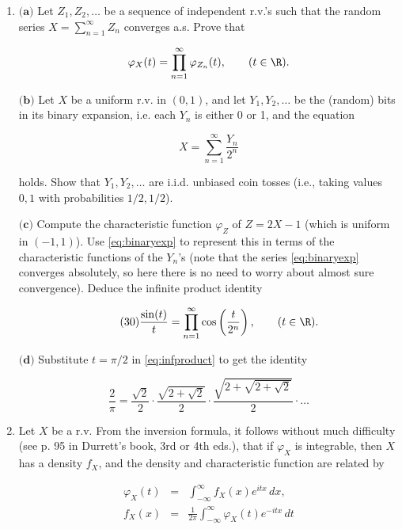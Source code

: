 \begin{enumerate}[label=\arabic*.]
\item $\textbf{(a)}$ Let $Z_1,Z_2,\ldots$ be a sequence of
independent r.v.'s such that the random series
$X = \sum_{n=1}^\infty Z_n$ converges a.s. Prove that

\[
\varphi_X(t) = \prod_{n=1}^\infty \varphi_{Z_n}(t), \qquad (t\in \R).
\]

\noindent $\textbf{(b)}$ Let $X$ be a uniform r.v. in $(0,1)$,
and let $Y_1, Y_2, \ldots$ be the (random) bits in
its binary expansion, i.e. each $Y_n$ is either 0 or
1, and the equation

\begin{equation*}
\tag{29}\label{eq:binaryexp}
X = \sum_{n=1}^\infty \frac{Y_n}{2^n}
\end{equation*}

\noindent holds. Show that $Y_1, Y_2, \ldots$ are i.i.d.
unbiased coin tosses (i.e., taking values $0,1$ with
probabilities $1/2,1/2$).

$\textbf{(c)}$ Compute the characteristic function
$\varphi_Z$ of $Z=2X-1$ (which is uniform in
$(-1,1)$). Use \eqref{eq:binaryexp} to represent this in
terms of the characteristic functions of the $Y_n$'s
(note that the series \eqref{eq:binaryexp} converges
absolutely, so here there is no need to worry about
almost sure convergence). Deduce the infinite product
identity

\begin{equation*}
\tag{30}\label{eq:infproduct}
\frac{\sin(t)}{t} = \prod_{n=1}^\infty \cos\left(\frac{t}{2^n} \right), \qquad (t\in \R).
\end{equation*}

\noindent $\textbf{(d)}$ Substitute $t=\pi/2$ in
\eqref{eq:infproduct} to get the identity

\[
\frac{2}{\pi} = \frac{\sqrt{2}}{2}\cdot \frac{\sqrt{2+\sqrt{2}}}{2} \cdot \frac{\sqrt{2+\sqrt{2+\sqrt{2}}}}{2} \cdot \ldots
\]

\item Let $X$ be a r.v. From the inversion formula, it
follows without much difficulty (see p. 95 in
Durrett's book, 3rd or 4th eds.), that if $\varphi_X$
is integrable, then $X$ has a density $f_X$, and the
density and characteristic function are related by

\begin{eqnarray*} \varphi_X(t) &=& \int_{-\infty}^\infty f_X(x) e^{itx}\,dx,  \\
f_X(x) &=& \frac{1}{2\pi} \int_{-\infty}^\infty \varphi_X(t) e^{-itx}\,dt
\end{eqnarray*}


\end{enumerate}
